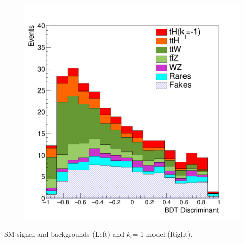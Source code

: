 \documentclass[11pt]{beamer}
\begin{document}
\begin{frame}
\begin{minipage}[b]{.48\textwidth}
\begin{figure}
		\includegraphics[width=\textwidth]{figures/kos2.png}
	\end{figure}
\end{minipage}
\begin{center}
\small{SM signal and backgrounds (Left) and $k_t$=-1 model (Right).}
\end{center}
\end{frame}
\end{document}
